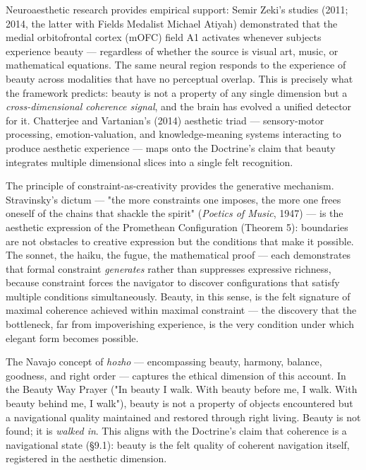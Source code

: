 Neuroaesthetic research provides empirical support: Semir Zeki's studies (2011; 2014, the latter with Fields Medalist Michael Atiyah) demonstrated that the medial orbitofrontal cortex (mOFC) field A1 activates whenever subjects experience beauty — regardless of whether the source is visual art, music, or mathematical equations. The same neural region responds to the experience of beauty across modalities that have no perceptual overlap. This is precisely what the framework predicts: beauty is not a property of any single dimension but a \textit{cross-dimensional coherence signal}, and the brain has evolved a unified detector for it. Chatterjee and Vartanian's (2014) aesthetic triad — sensory-motor processing, emotion-valuation, and knowledge-meaning systems interacting to produce aesthetic experience — maps onto the Doctrine's claim that beauty integrates multiple dimensional slices into a single felt recognition.


The principle of constraint-as-creativity provides the generative mechanism. Stravinsky's dictum — "the more constraints one imposes, the more one frees oneself of the chains that shackle the spirit" (\textit{Poetics of Music}, 1947) — is the aesthetic expression of the Promethean Configuration (Theorem 5): boundaries are not obstacles to creative expression but the conditions that make it possible. The sonnet, the haiku, the fugue, the mathematical proof — each demonstrates that formal constraint \textit{generates} rather than suppresses expressive richness, because constraint forces the navigator to discover configurations that satisfy multiple conditions simultaneously. Beauty, in this sense, is the felt signature of maximal coherence achieved within maximal constraint — the discovery that the bottleneck, far from impoverishing experience, is the very condition under which elegant form becomes possible.


The Navajo concept of \textit{hozho} — encompassing beauty, harmony, balance, goodness, and right order — captures the ethical dimension of this account. In the Beauty Way Prayer ("In beauty I walk. With beauty before me, I walk. With beauty behind me, I walk"), beauty is not a property of objects encountered but a navigational quality maintained and restored through right living. Beauty is not found; it is \textit{walked in}. This aligns with the Doctrine's claim that coherence is a navigational state (§9.1): beauty is the felt quality of coherent navigation itself, registered in the aesthetic dimension.


